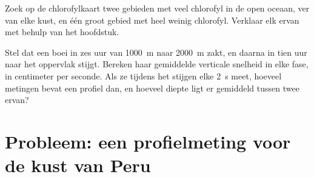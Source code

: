 \begin{exercise}[$\star\star\star$]\label{exo:g10:layered-ocean:14}
Zoek op de chlorofylkaart twee gebieden met veel chlorofyl in de open oceaan,
ver van elke kust, en één groot gebied met heel weinig chlorofyl. Verklaar elk
ervan met behulp van het hoofdstuk.
\end{exercise}

\begin{exercise}[$\star\star\star$]\label{exo:g10:layered-ocean:15}
Stel dat een boei in zes uur van \qty{1000}{m} naar \qty{2000}{m} zakt, en
daarna in tien uur naar het oppervlak stijgt. Bereken haar gemiddelde verticale
snelheid in elke fase, in centimeter per seconde. Als ze tijdens het stijgen
elke \qty{2}{s} meet, hoeveel metingen bevat een profiel dan, en
hoeveel diepte ligt er gemiddeld tussen twee ervan?
\end{exercise}

\section{Probleem: een profielmeting voor de kust van Peru}

